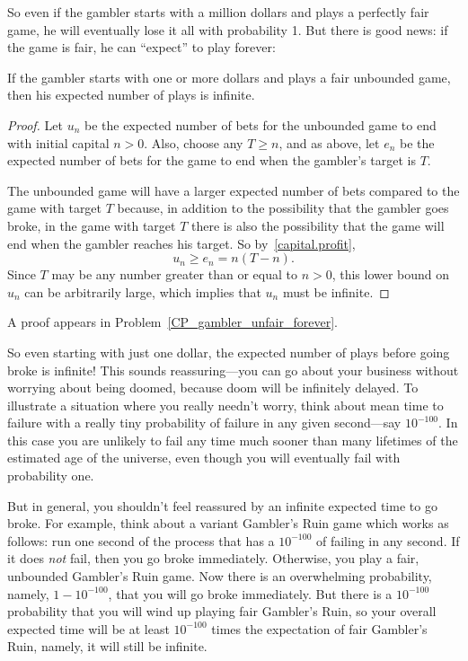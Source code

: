 So even if the gambler starts with a million dollars and plays a
perfectly fair game, he will eventually lose it all with probability
1.  But there is good news: if the game is fair, he can ``expect'' to
play forever:

\begin{lemma}\label{LN12:play forever}
If the gambler starts with one or more dollars and plays a fair
unbounded game, then his expected number of plays is infinite.
\end{lemma}

\begin{editingnotes}
\begin{proof}
Let $u_n$ be the expected number of bets for the unbounded game
to end with initial capital $n>0$.  Also, choose any $T \geq n$, and as
above, let $e_n$ be the expected number of bets for the game to end
when the gambler's target is $T$.

The unbounded game will have a larger expected number of bets compared
to the game with target $T$ because, in addition to the possibility
that the gambler goes broke, in the game with target $T$ there is also
the possibility that the game will end when the gambler reaches his
target.  So by~\eqref{capital.profit},
\[
u_n \geq e_n = n(T-n).
\]
Since $T$ may be any number greater than or equal to $n>0$, this lower
bound on $u_n$ can be arbitrarily large, which implies that $u_n$ must
be infinite.
\end{proof}
\end{editingnotes}

A proof appears in Problem~\ref{CP_gambler_unfair_forever}.

So even starting with just one dollar, the expected number of plays
before going broke is infinite!  This sounds reassuring---you can go
about your business without worrying about being doomed, because doom
will be infinitely delayed.  To illustrate a situation where you
really needn't worry, think about mean time to failure with a really
tiny probability of failure in any given second---say $10^{-100}$.  In
this case you are unlikely to fail any time much sooner than many
lifetimes of the estimated age of the universe, even though you will
eventually fail with probability one.

But in general, you shouldn't feel reassured by an infinite expected
time to go broke.  For example, think about a variant Gambler's Ruin
game which works as follows: run one second of the process that has a
$10^{-100}$ of failing in any second.  If it does \emph{not} fail,
then you go broke immediately.  Otherwise, you play a fair, unbounded
Gambler's Ruin game.  Now there is an overwhelming probability,
namely, $1-10^{-100}$, that you will go broke immediately.  But there
is a $10^{-100}$ probability that you will wind up playing fair
Gambler's Ruin, so your overall expected time will be at least
$10^{-100}$ times the expectation of fair Gambler's Ruin, namely, it
will still be infinite.


